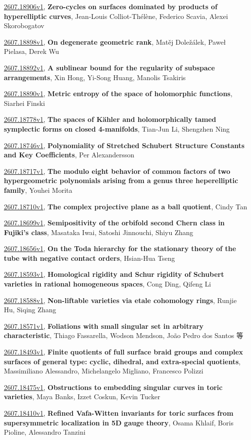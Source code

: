 \documentclass[9pt, a4paper]{article}
\theoremstyle{plain}
\theoremstyle{definition}
\theoremstyle{remark}
\newcommand{\arxiv}[3]{\href{https://arxiv.org/abs/#1}{#1}, \textbf{\textcolor{arxivblue}{#2}}, #3}
\begin{document}
\arxiv{2607.18906v1}{Zero-cycles on surfaces dominated by products of hyperelliptic curves}{Jean-Louis Colliot-Thélène, Federico Scavia, Alexei Skorobogatov}

\arxiv{2607.18898v1}{On degenerate geometric rank}{Matěj Doležálek, Paweł Pielasa, Derek Wu}

\arxiv{2607.18892v1}{A sublinear bound for the regularity of subspace arrangements}{Xin Hong, Yi-Song Huang, Manolis Tsakiris}

\arxiv{2607.18890v1}{Metric entropy of the space of holomorphic functions}{Siarhei Finski}

\arxiv{2607.18778v1}{The spaces of Kähler and holomorphically tamed symplectic forms on closed 4-manifolds}{Tian-Jun Li, Shengzhen Ning}

\arxiv{2607.18746v1}{Polynomiality of Stretched Schubert Structure Constants and Key Coefficients}{Per Alexandersson}

\arxiv{2607.18717v1}{The modulo eight behavior of common factors of two hypergeometric polynomials arising from a genus three heperelliptic family}{Youhei Morita}

\arxiv{2607.18710v1}{The complex projective plane as a ball quotient}{Cindy Tan}

\arxiv{2607.18699v1}{Semipositivity of the orbifold second Chern class in Fujiki's class}{Masataka Iwai, Satoshi Jinnouchi, Shiyu Zhang}

\arxiv{2607.18656v1}{On the Toda hierarchy for the stationary theory of the tube with negative contact orders}{Hsian-Hua Tseng}

\arxiv{2607.18593v1}{Homological rigidity and Schur rigidity of Schubert varieties in rational homogeneous spaces}{Cong Ding, Qifeng Li}

\arxiv{2607.18588v1}{Non-liftable varieties via etale cohomology rings}{Runjie Hu, Siqing Zhang}

\arxiv{2607.18571v1}{Foliations with small singular set in arbitrary characteristic}{Thiago Fassarella, Wodson Mendson, João Pedro dos Santos 等}

\arxiv{2607.18493v1}{Finite quotients of full surface braid groups and complex surfaces of general type: cyclic, dihedral, and extra-special quotients}{Massimiliano Alessandro, Michelangelo Migliano, Francesco Polizzi}

\arxiv{2607.18475v1}{Obstructions to embedding singular curves in toric varieties}{Maya Banks, Izzet Coskun, Kevin Tucker}

\arxiv{2607.18410v1}{Refined Vafa-Witten invariants for toric surfaces from supersymmetric localization in 5D gauge theory}{Osama Khlaif, Boris Pioline, Alessandro Tanzini}
\end{document}
